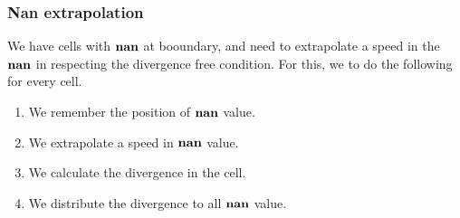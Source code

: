 \subsubsection{Nan extrapolation}

We have cells with $\mathop{\textbf{nan}}$ at booundary, and need to extrapolate a speed in the $\mathop{\textbf{nan}}$ in respecting the divergence free condition.
For this, we to do the following for every cell.
\begin{enumerate}
\item We remember the position of $\mathop{\textbf{nan}}$ value.
\item We extrapolate a speed in $\mathop{\textbf{nan}}$ value.
\item We calculate the divergence in the cell.
\item We distribute the divergence to all $\mathop{\textbf{nan}}$ value.
\end{enumerate}


